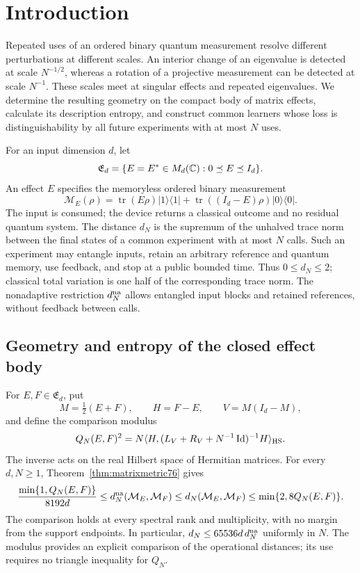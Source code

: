 \section{Introduction}

Repeated uses of an ordered binary quantum measurement resolve
different perturbations at different scales.  An interior change of
an eigenvalue is detected at scale $N^{-1/2}$, whereas a rotation of
a projective measurement can be detected at scale $N^{-1}$.  These
scales meet at singular effects and repeated eigenvalues.  We
determine the resulting geometry on the compact body of matrix
effects, calculate its description entropy, and construct common
learners whose loss is distinguishability by all future experiments
with at most $N$ uses.

For an input dimension $d$, let
\[
 \mathfrak E_d=\{E=E^*\in M_d(\mathbb C):0\preceq E\preceq I_d\}.
\]
An effect $E$ specifies the memoryless ordered binary measurement
\[
 \mathcal M_E(\rho)=\operatorname{tr}(E\rho)|1\rangle\langle1|
       +\operatorname{tr}((I_d-E)\rho)|0\rangle\langle0|.
\]
The input is consumed; the device returns a classical outcome and
no residual quantum system.  The distance $d_N$ is the supremum
of the unhalved trace norm between the final states of a common
experiment with at most $N$ calls.  Such an experiment may entangle
inputs, retain an arbitrary reference and quantum memory, use
feedback, and stop at a public bounded time.  Thus $0\le d_N\le2$;
classical total variation is one half of the corresponding trace
norm.  The nonadaptive restriction $d_N^{\rm na}$ allows entangled
input blocks and retained references, without feedback between calls.

\subsection{Geometry and entropy of the closed effect body}
For $E,F\in\mathfrak E_d$, put
\[
 M=\tfrac12(E+F),\qquad H=F-E,\qquad V=M(I_d-M),
\]
and define the comparison modulus
\[
 Q_N(E,F)^2=N\langle H,
       (L_V+R_V+N^{-1}\operatorname{Id})^{-1}H\rangle_{\rm HS}.
\]
The inverse acts on the real Hilbert space of Hermitian matrices.
For every $d,N\ge1$, Theorem~\ref{thm:matrixmetric76} gives
\begin{equation}\label{eq:intrometric77}
 \frac{\min\{1,Q_N(E,F)\}}{8192d}
 \le d_N^{\rm na}(\mathcal M_E,\mathcal M_F)
 \le d_N(\mathcal M_E,\mathcal M_F)
 \le\min\{2,8Q_N(E,F)\}.
\end{equation}
The comparison holds at every spectral rank and multiplicity, with
no margin from the support endpoints.  In particular,
$d_N\le65536d\,d_N^{\rm na}$ uniformly in $N$.  The modulus
provides an explicit comparison of the operational distances;
its use requires no triangle inequality for $Q_N$.

